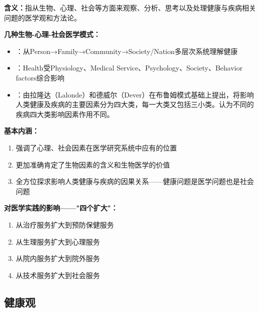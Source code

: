 \begin{keybox}
\textbf{含义：}指从生物、心理、社会等方面来观察、分析、思考以及处理健康与疾病相关问题的医学观和方法论。

\textbf{几种生物-心理-社会医学模式：}
\begin{itemize}[leftmargin=*]
    \item {}：从Person→Family→Community→Society/Nation多层次系统理解健康
    \item {}：Health受Physiology、Medical Service、Psychology、Society、Behavior factors综合影响
    \item {}：由拉隆达（Lalonde）和德威尔（Dever）在布鲁姆模式基础上提出，将影响人类健康及疾病的主要因素分为四大类，每一大类又包括三小类。认为不同的疾病四大类影响因素作用不同。
\end{itemize}

\textbf{基本内涵：}
\begin{enumerate}[leftmargin=*]
    \item 强调了心理、社会因素在医学研究系统中应有的位置
    \item 更加准确肯定了生物因素的含义和生物医学的价值
    \item 全方位探求影响人类健康与疾病的因果关系——健康问题是医学问题也是社会问题
\end{enumerate}

\textbf{对医学实践的影响——"四个扩大"：}
\begin{enumerate}[leftmargin=*]
    \item 从治疗服务扩大到预防保健服务
    \item 从生理服务扩大到心理服务
    \item 从院内服务扩大到院外服务
    \item 从技术服务扩大到社会服务
\end{enumerate}
\end{keybox}

\subsection{健康观}

